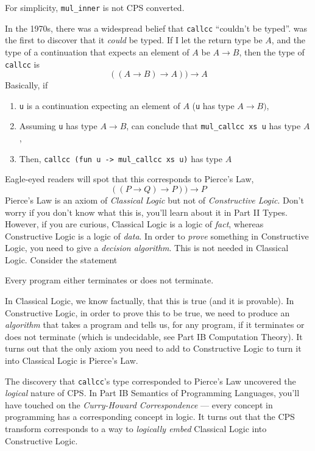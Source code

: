 For simplicity, \texttt{mul\_inner} is not CPS converted. 

In the 1970s, there was a widespread belief that \texttt{callcc} ``couldn't be typed''. \citet{griffin-1990} was the first to discover that it \emph{could} be typed. If I let the return type be $A$, and the type of a continuation that expects an element of $A$ be $A \rightarrow B$, then the type of \texttt{callcc} is
\[((A \rightarrow B) \rightarrow A)) \rightarrow A\]
Basically, if
\begin{enumerate}
    \item \texttt{u} is a continuation expecting an element of $A$ (\texttt{u} has type $A \rightarrow B)$,
    \item Assuming \texttt{u} has type $A \rightarrow B$, can conclude that \texttt{mul\_callcc xs u} has type $A$,
    \item Then, \texttt{callcc (fun u -> mul\_callcc xs u)} has type $A$
\end{enumerate} 

Eagle-eyed readers will spot that this corresponds to Pierce's Law, 
\[((P \rightarrow Q) \rightarrow P)) \rightarrow P\]
Pierce's Law is an axiom of \emph{Classical Logic} but not of \emph{Constructive Logic}. Don't worry if you don't know what this is, you'll learn about it in {\sffamily Part II Types}. However, if you are curious, Classical Logic is a logic of \emph{fact}, whereas Constructive Logic is a logic of \emph{data}. In order to \emph{prove} something in Constructive Logic, you need to give a \emph{decision algorithm}. This is not needed in Classical Logic. Consider the statement 

\begin{center}
    Every program either terminates or does not terminate.
\end{center}

In Classical Logic, we know factually, that this is true (and it is provable). In Constructive Logic, in order to prove this to be true, we need to produce an \emph{algorithm} that takes a program and tells us, for any program, if it terminates or does not terminate (which is undecidable, see {\sffamily Part IB Computation Theory}). It turns out that the only axiom you need to add to Constructive Logic to turn it into Classical Logic is Pierce's Law. 

The discovery that \texttt{callcc}'s type corresponded to Pierce's Law uncovered the \emph{logical} nature of CPS. In {\sffamily Part IB Semantics of Programming Languages}, you'll have touched on the \emph{Curry-Howard Correspondence} --- every concept in programming has a corresponding concept in logic. It turns out that the CPS transform corresponds to a way to \emph{logically embed} Classical Logic into Constructive Logic.

